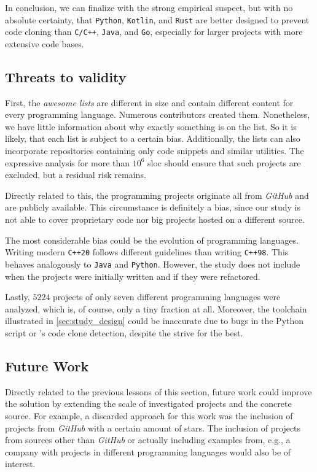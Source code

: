 In conclusion, we can finalize with the strong empirical suspect, but with no absolute certainty, that \texttt{Python}, \texttt{Kotlin}, and \texttt{Rust} are better designed to prevent code cloning than \texttt{C/C++}, \texttt{Java}, and \texttt{Go}, especially for larger projects with more extensive code bases.

 
\subsection{Threats to validity}

First, the \textit{awesome lists} are different in size and contain different content for every programming language. Numerous contributors created them. Nonetheless, we have little information about why exactly something is on the list. So it is likely, that each list is subject to a certain bias. Additionally, the lists can also incorporate repositories containing only code snippets and similar utilities. The expressive analysis for more than $10^6$ \ac{sloc} should ensure that such projects are excluded, but a residual risk remains.

Directly related to this, the programming projects originate all from \textit{GitHub} and are publicly available. This circumstance is definitely a bias, since our study is not able to cover proprietary code nor big projects hosted on a different source.

The most considerable bias could be the evolution of programming languages. Writing modern \texttt{C++20} follows different guidelines than writing \texttt{C++98}. This behaves analogously to \texttt{Java} and \texttt{Python}. However, the study does not include when the projects were initially written and if they were refactored.

Lastly, $5224$ projects of only seven different programming languages were analyzed, which is, of course, only a tiny fraction at all. Moreover, the toolchain illustrated in \autoref{sec:study_design} could be inaccurate due to bugs in the Python script or \teamscale{}'s code clone detection, despite the strive for the best.

\subsection{Future Work}

Directly related to the previous lessons of this section, future work could improve the solution by extending the scale of investigated projects and the concrete source. For example, a discarded approach for this work was the inclusion of projects from \textit{GitHub} with a certain amount of stars. The inclusion of projects from sources other than \textit{GitHub} or actually including examples from, e.g., a company with projects in different programming languages would also be of interest.

